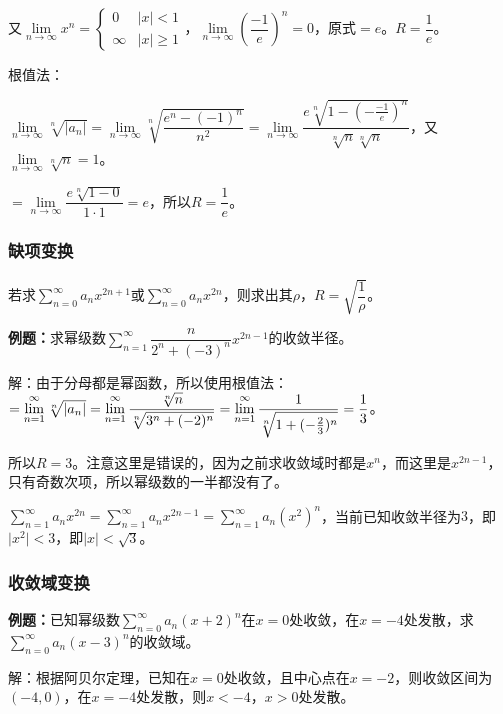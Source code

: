 \documentclass[UTF8, 12pt]{ctexart}
\begin{document}
又$\lim\limits_{n\to\infty}x^n=\left\{\begin{array}{ll}
    0 & \vert x\vert<1 \\
    \infty & \vert x\vert\geqslant1
\end{array}\right.$，$\lim\limits_{n\to\infty}\left(\dfrac{-1}{e}\right)^n=0$，原式$=e$。$R=\dfrac{1}{e}$。

根值法：

$\lim\limits_{n\to\infty}\sqrt[n]{\vert a_n\vert}=\lim\limits_{n\to\infty}\sqrt[n]{\dfrac{e^n-(-1)^n}{n^2}}=\lim\limits_{n\to\infty}\dfrac{e\sqrt[n]{1-(-\frac{-1}{e})^n}}{\sqrt[n]{n}\sqrt[n]{n}}$，又$\lim\limits_{n\to\infty}\sqrt[n]{n}=1$。

$=\lim\limits_{n\to\infty}\dfrac{e\sqrt[n]{1-0}}{1\cdot1}=e$，所以$R=\dfrac{1}{e}$。

\subsubsection{缺项变换}

若求$\sum\limits_{n=0}^\infty a_nx^{2n+1}$或$\sum\limits_{n=0}^\infty a_nx^{2n}$，则求出其$\rho$，$R=\sqrt{\dfrac{1}{\rho}}$。

\textbf{例题：}求幂级数$\sum\limits_{n=1}^\infty\dfrac{n}{2^n+(-3)^n}x^{2n-1}$的收敛半径。

解：由于分母都是幂函数，所以使用根值法：$=\lim\limits_{n=1}^\infty\sqrt[n]{\vert a_n\vert}=\lim\limits_{n=1}^\infty\dfrac{\sqrt[n]{n}}{\sqrt[n]{3^n+(-2)^n}}\\=\lim\limits_{n=1}^\infty\dfrac{1}{\sqrt[n]{1+(-\frac{2}{3})^n}}=\dfrac{1}{3}$。

所以$R=3$。注意这里是错误的，因为之前求收敛域时都是$x^n$，而这里是$x^{2n-1}$，只有奇数次项，所以幂级数的一半都没有了。

$\sum\limits_{n=1}^\infty a_nx^{2n}=\sum\limits_{n=1}^\infty a_nx^{2n-1}=\sum\limits_{n=1}^\infty a_n(x^2)^n$，当前已知收敛半径为$3$，即$\vert x^2\vert<3$，即$\vert x\vert<\sqrt{3}$。

\subsubsection{收敛域变换}

\textbf{例题：}已知幂级数$\sum\limits_{n=0}^\infty a_n(x+2)^n$在$x=0$处收敛，在$x=-4$处发散，求$\sum\limits_{n=0}^\infty a_n(x-3)^n$的收敛域。

解：根据阿贝尔定理，已知在$x=0$处收敛，且中心点在$x=-2$，则收敛区间为$(-4,0)$，在$x=-4$处发散，则$x<-4$，$x>0$处发散。
\end{document}
